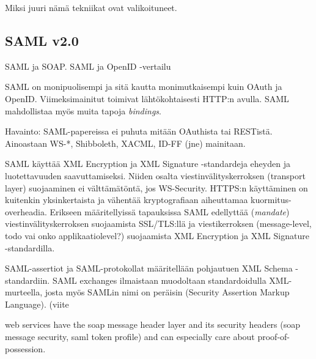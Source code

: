 \documentclass[finnish,gradu]{tktltiki}
\begin{document}
  Miksi juuri nämä tekniikat ovat valikoituneet.



  \subsection{SAML v2.0} %
  \label{sub:saml_v2_0}


  SAML ja SOAP.   SAML ja OpenID -vertailu \cite{venn_of_identity_2008}

  SAML on monipuolisempi ja sitä kautta monimutkaisempi kuin OAuth ja OpenID. Viimeksimainitut toimivat lähtökohtaisesti HTTP:n avulla. SAML mahdollistaa myös muita tapoja \emph{bindings}.

  Havainto: SAML-papereissa ei puhuta mitään OAuthista tai RESTistä. Ainoastaan WS-*, Shibboleth, XACML, ID-FF (jne) mainitaan.

  SAML käyttää XML Encryption ja XML Signature -standardeja eheyden ja luotettavuuden saavuttamiseksi.
  Niiden osalta viestinvälityskerroksen (transport layer) suojaaminen ei välttämätöntä, jos WS-Security.
  HTTPS:n käyttäminen on kuitenkin yksinkertaista ja vähentää kryptografiaan aiheuttamaa kuormitus-overheadia.
  Erikseen määritellyissä tapauksissa SAML edellyttää (\emph{mandate}) viestinvälityskerroksen suojaamista SSL/TLS:llä ja viestikerroksen (message-level, todo vai onko applikaatiolevel?) suojaamista XML Encryption ja XML Signature -standardilla.

  SAML-assertiot ja SAML-protokollat määritellään pohjautuen XML Schema -standardiin.
  SAML exchanges ilmaistaan muodoltaan standardoidulla XML-murteella, josta myös SAMLin nimi on peräisin (Security Assertion Markup Language). (viite

  web services have the soap message header layer and its security headers (soap message security, saml token profile) and can especially care about proof-of-possession.

\end{document}
